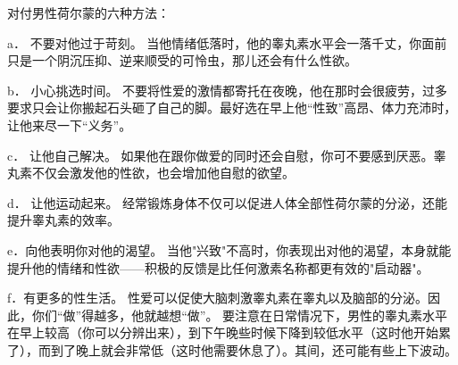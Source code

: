 \documentclass[12pt,UTF8,openany]{ctexbook}
\begin{document}
对付男性荷尔蒙的六种方法：

a． 不要对他过于苛刻。
当他情绪低落时，他的睾丸素水平会一落千丈，你面前只是一个阴沉压抑、逆来顺受的可怜虫，那儿还会有什么性欲。

b． 小心挑选时间。
不要将性爱的激情都寄托在夜晚，他在那时会很疲劳，过多要求只会让你搬起石头砸了自己的脚。最好选在早上他“性致”高昂、体力充沛时，让他来尽一下“义务”。

c． 让他自己解决。
如果他在跟你做爱的同时还会自慰，你可不要感到厌恶。睾丸素不仅会激发他的性欲，也会增加他自慰的欲望。

d． 让他运动起来。
经常锻炼身体不仅可以促进人体全部性荷尔蒙的分泌，还能提升睾丸素的效率。

e．向他表明你对他的渴望。
当他"兴致"不高时，你表现出对他的渴望，本身就能提升他的情绪和性欲——积极的反馈是比任何激素名称都更有效的"启动器"。

f．有更多的性生活。
性爱可以促使大脑刺激睾丸素在睾丸以及脑部的分泌。因此，你们“做”得越多，他就越想“做”。
要注意在日常情况下，男性的睾丸素水平在早上较高（你可以分辨出来），到下午晚些时候下降到较低水平（这时他开始累了），而到了晚上就会非常低（这时他需要休息了）。其间，还可能有些上下波动。
\end{document}

